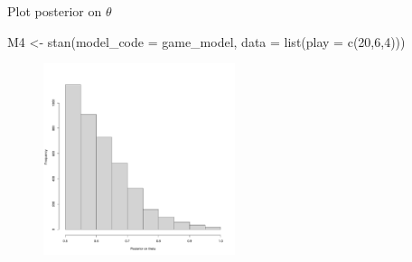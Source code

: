 \documentclass[
  11pt,
  ignorenonframetext,
]{beamer}
\newenvironment{Shaded}{\begin{snugshade}}{\end{snugshade}}
\newcommand{\AttributeTok}[1]{\textcolor[rgb]{0.40,0.45,0.13}{#1}}
\newcommand{\DecValTok}[1]{\textcolor[rgb]{0.68,0.00,0.00}{#1}}
\newcommand{\FunctionTok}[1]{\textcolor[rgb]{0.28,0.35,0.67}{#1}}
\newcommand{\NormalTok}[1]{\textcolor[rgb]{0.00,0.23,0.31}{#1}}
\newcommand{\OtherTok}[1]{\textcolor[rgb]{0.00,0.23,0.31}{#1}}
\begin{document}
\begin{frame}[fragile]{Plot posterior on \(\theta\)}
\protect\hypertarget{plot-posterior-on-theta-1}{}
\begin{Shaded}
\begin{Highlighting}[]
\NormalTok{M4 }\OtherTok{\textless{}{-}} \FunctionTok{stan}\NormalTok{(}\AttributeTok{model\_code =}\NormalTok{ game\_model,  }
           \AttributeTok{data =} \FunctionTok{list}\NormalTok{(}\AttributeTok{play =} \FunctionTok{c}\NormalTok{(}\DecValTok{20}\NormalTok{,}\DecValTok{6}\NormalTok{,}\DecValTok{4}\NormalTok{)))}
\end{Highlighting}
\end{Shaded}

\begin{figure}

{\centering \includegraphics[width=0.5\textwidth,height=\textheight]{0_lectures_files/figure-beamer/unnamed-chunk-350-1.pdf}

}

\end{figure}
\end{frame}
\end{document}
